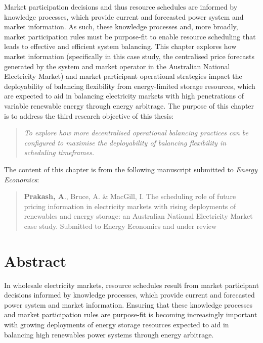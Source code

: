 \documentclass[12pt,a4paper,]{report}
\begin{document}
Market participation decisions and thus resource schedules are informed
by knowledge processes, which provide current and forecasted power
system and market information. As such, these knowledge processes and,
more broadly, market participation rules must be purpose-fit to enable
resource scheduling that leads to effective and efficient system
balancing. This chapter explores how market information (specifically in
this case study, the centralised price forecasts generated by the system
and market operator in the Australian National Electricity Market) and
market participant operational strategies impact the deployability of
balancing flexibility from energy-limited storage resources, which are
expected to aid in balancing electricity markets with high penetrations
of variable renewable energy through energy arbitrage. The purpose of
this chapter is to address the third research objective of this thesis:

\begin{quote}
\emph{To explore how more decentralised operational balancing practices
can be configured to maximise the deployability of balancing flexibility
in scheduling timeframes.}
\end{quote}

The content of this chapter is from the following manuscript submitted
to \emph{Energy Economics}:

\begin{quote}
\textbf{Prakash, A}., Bruce, A. \& MacGill, I. The scheduling role of
future pricing information in electricity markets with rising
deployments of renewables and energy storage: an Australian National
Electricity Market case study. Submitted to Energy Economics and under
review
\end{quote}

\hypertarget{abstract-3}{%
\section{Abstract}\label{abstract-3}}

In wholesale electricity markets, resource schedules result from market
participant decisions informed by knowledge processes, which provide
current and forecasted power system and market information. Ensuring
that these knowledge processes and market participation rules are
purpose-fit is becoming increasingly important with growing deployments
of energy storage resources expected to aid in balancing high renewables
power systems through energy arbitrage.
\end{document}
